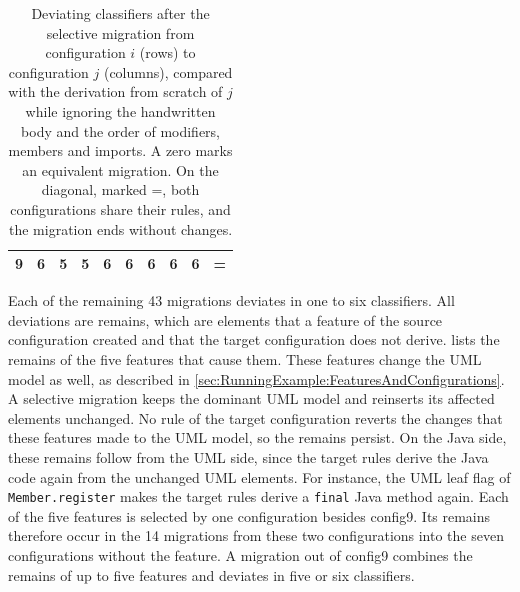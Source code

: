 \begin{table}[htbp]
\begin{tabular}{|l|c|c|c|c|c|c|c|c|c|}
        \hline
        \textbf{9}                        & 6          & 5          & 5          & 6          & 6          & 6          & 6          & 6          & =          \\
        \hline
    \end{tabular}
    \caption{Deviating classifiers after the selective migration from configuration $i$ (rows) to configuration $j$ (columns), compared with the derivation from scratch of $j$ while ignoring the handwritten body and the order of modifiers, members and imports. A zero marks an equivalent migration. On the diagonal, marked =, both configurations share their rules, and the migration ends without changes.}
    \label{table:migration-matrix}
\end{table}

Each of the remaining 43 migrations deviates in one to six classifiers.
All deviations are remains, which are elements that a feature of the source configuration created and that the target configuration does not derive.
 lists the remains of the five features that cause them.
These features change the UML model as well, as described in \autoref{sec:RunningExample:FeaturesAndConfigurations}.
A selective migration keeps the dominant UML model and reinserts its affected elements unchanged.
No rule of the target configuration reverts the changes that these features made to the UML model, so the remains persist.
On the Java side, these remains follow from the UML side, since the target rules derive the Java code again from the unchanged UML elements.
For instance, the UML leaf flag of \texttt{Member.register} makes the target rules derive a \texttt{final} Java method again.
Each of the five features is selected by one configuration besides config9.
Its remains therefore occur in the 14 migrations from these two configurations into the seven configurations without the feature.
A migration out of config9 combines the remains of up to five features and deviates in five or six classifiers.

